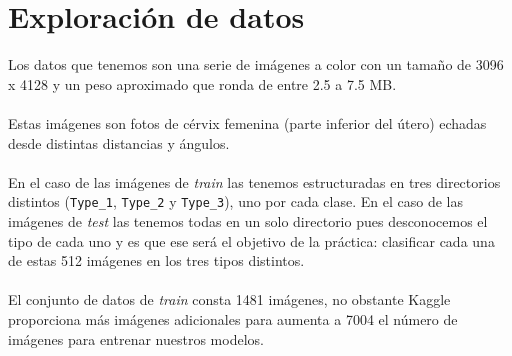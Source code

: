 	
	

	
\setcounter{page}{0}

\maketitle %
\thispagestyle{empty}

\newpage %

\tableofcontents %


\newpage


\section{Exploración de datos}

Los datos que tenemos son una serie de imágenes a color con un tamaño de 3096 x 4128 y un peso aproximado que ronda de entre 2.5 a 7.5 MB.
\\ \\
Estas imágenes son fotos de cérvix femenina (parte inferior del útero) echadas desde distintas distancias y ángulos.
\\ \\
En el caso de las imágenes de \textit{train} las tenemos estructuradas en tres directorios distintos (\texttt{Type\_1}, \texttt{Type\_2} y \texttt{Type\_3}), uno por cada clase. En el caso de las imágenes de \textit{test} las tenemos todas en un solo directorio pues desconocemos el tipo de cada uno y es que ese será el objetivo de la práctica: clasificar cada una de estas 512 imágenes en los tres tipos distintos.
\\ \\
El conjunto de datos de \textit{train} consta 1481 imágenes, no obstante Kaggle proporciona más imágenes adicionales para aumenta a 7004 el número de imágenes para entrenar nuestros modelos.

